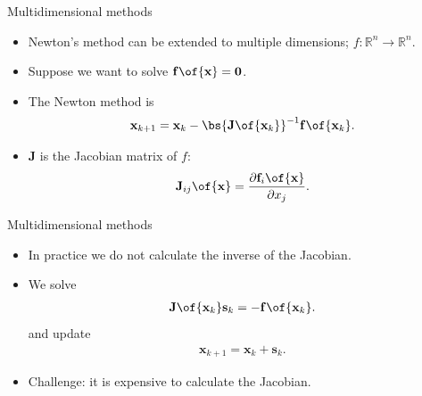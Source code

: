 \documentclass[11pt,xcolor={dvipsnames},aspectratio=159,hyperref={pdftex,pdfpagemode=UseNone,hidelinks,pdfdisplaydoctitle=true},usepdftitle=false]{beamer}
\begin{document}
\begin{frame}{Multidimensional methods}
    
    \begin{itemize} 
    \item Newton's method can be extended to multiple dimensions; $f:\mathbb{R}^n \rightarrow \mathbb{R}^n$.
    \item Suppose we want to solve $\mathbf{f}\of{\mathbf{x}} = \mathbf{0}$.
    \item The Newton method is \begin{align*}
        \mathbf{x}_{k+1} = \mathbf{x}_k - \bs{\mathbf{J}\of{\mathbf{x}_k}}^{-1} \mathbf{f}\of{\mathbf{x}_k}.
\end{align*}
\item $\mathbf{J}$ is the Jacobian matrix of $f$: \begin{align*}
    \mathbf{J}_{ij}\of{\mathbf{x}} = \frac{\partial \mathbf{f}_i\of{\mathbf{x}}}{\partial x_j}.
\end{align*}
\end{itemize}
\end{frame}

\begin{frame}{Multidimensional methods}
    
    \begin{itemize} 
    \item In practice we do not calculate the inverse of the Jacobian.
    \item We solve \begin{align*}
        \mathbf{J}\of{\mathbf{x}_k}\mathbf{s}_k = -\mathbf{f}\of{\mathbf{x}_k}.
    \end{align*}
    and update \begin{align*}
        \mathbf{x}_{k+1} = \mathbf{x}_k + \mathbf{s}_k. 
    \end{align*}
    \item Challenge: it is expensive to calculate the Jacobian.
\end{itemize}
\end{frame}
\end{document}
